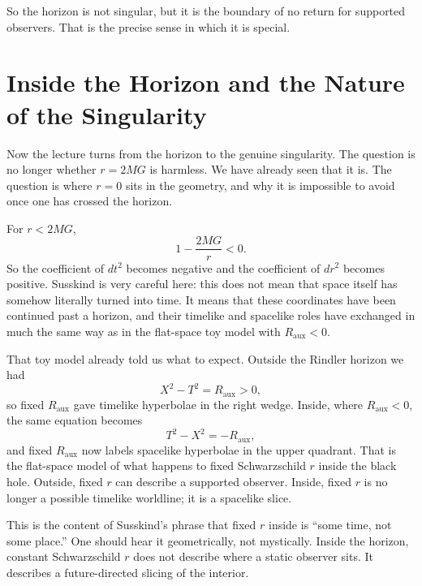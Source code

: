 So the horizon is not singular, but it is the boundary of no return for supported observers. That is the precise sense in which it is special.

\section{Inside the Horizon and the Nature of the Singularity}

Now the lecture turns from the horizon to the genuine singularity. The question is no longer whether \(r=2MG\) is harmless. We have already seen that it is. The question is where \(r=0\) sits in the geometry, and why it is impossible to avoid once one has crossed the horizon.

For \(r<2MG\),
\begin{equation}
1-\frac{2MG}{r}<0.
\end{equation}
So the coefficient of \(dt^2\) becomes negative and the coefficient of \(dr^2\) becomes positive. Susskind is very careful here: this does not mean that space itself has somehow literally turned into time. It means that these coordinates have been continued past a horizon, and their timelike and spacelike roles have exchanged in much the same way as in the flat-space toy model with \(R_{\mathrm{aux}}<0\).

That toy model already told us what to expect. Outside the Rindler horizon we had
\begin{equation}
X^2-T^2=R_{\mathrm{aux}}>0,
\end{equation}
so fixed \(R_{\mathrm{aux}}\) gave timelike hyperbolae in the right wedge. Inside, where \(R_{\mathrm{aux}}<0\), the same equation becomes
\begin{equation}
T^2-X^2=-R_{\mathrm{aux}},
\end{equation}
and fixed \(R_{\mathrm{aux}}\) now labels spacelike hyperbolae in the upper quadrant. That is the flat-space model of what happens to fixed Schwarzschild \(r\) inside the black hole. Outside, fixed \(r\) can describe a supported observer. Inside, fixed \(r\) is no longer a possible timelike worldline; it is a spacelike slice.

This is the content of Susskind’s phrase that fixed \(r\) inside is ``some time, not some place.'' One should hear it geometrically, not mystically. Inside the horizon, constant Schwarzschild \(r\) does not describe where a static observer sits. It describes a future-directed slicing of the interior.

